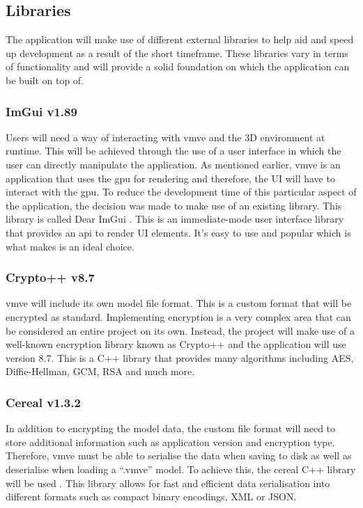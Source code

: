 \documentclass[11pt]{article}
\begin{document}
\subsection{Libraries}
The application will make use of different external libraries to help aid and
speed up development as a result of the short timeframe. These libraries vary in
terms of functionality and will provide a solid foundation on which the
application can be built on top of.

\subsubsection{ImGui v1.89}
Users will need a way of interacting with \gls*{vmve} and the 3D environment at
runtime. This will be achieved through the use of a user interface in which the
user can directly manipulate the application. As mentioned earlier, \gls*{vmve}
is an application that uses the \gls*{gpu} for rendering and therefore, the UI
will have to interact with the \gls*{gpu}. To reduce the development time of
this particular aspect of the application, the decision was made to make use of
an existing library. This library is called Dear ImGui \cite{imgui}. This is an
immediate-mode user interface library that provides an \gls*{api} to render UI
elements. It's easy to use and popular which is what makes is an ideal choice.

\subsubsection{Crypto++ v8.7} \label{custom_file_format}
\gls*{vmve} will include its own model file format. This is a custom format that
will be encrypted as standard. Implementing encryption is a very complex area
that can be considered an entire project on its own. Instead, the project will
make use of a well-known encryption library known as Crypto++ \cite{cryptopp}
and the application will use version 8.7. This is a C++ library that provides
many algorithms including AES, Diffie-Hellman, GCM, RSA and much more.

\subsubsection{Cereal v1.3.2}
In addition to encrypting the model data, the custom file format will need to
store additional information such as application version and encryption type.
Therefore, \gls*{vmve} must be able to serialise the data when saving to disk as
well as deserialise when loading a ``.vmve'' model. To achieve this, the cereal
C++ library will be used \cite{cereal}. This library allows for fast and
efficient data serialisation into different formats such as compact binary
encodings, XML or JSON.
\end{document}
